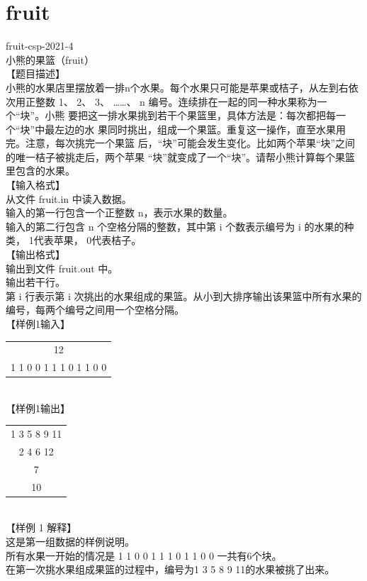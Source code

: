 \documentclass[12pt,twiside,a4paper]{ctexbook}
\numberwithin{chapter}{part}
\begin{document}
\section{fruit}
fruit-csp-2021-4\\
小熊的果篮（fruit）\\
【题目描述】\\
小熊的水果店里摆放着一排n个水果。每个水果只可能是苹果或桔子，从左到右依
次用正整数 1、 2、 3、 ……、 n 编号。连续排在一起的同一种水果称为一个“块”。小熊
要把这一排水果挑到若干个果篮里，具体方法是：每次都把每一个“块”中最左边的水
果同时挑出，组成一个果篮。重复这一操作，直至水果用完。注意，每次挑完一个果篮
后，“块”可能会发生变化。比如两个苹果“块”之间的唯一桔子被挑走后，两个苹果
“块”就变成了一个“块”。请帮小熊计算每个果篮里包含的水果。\\
【输入格式】\\
从文件 fruit.in 中读入数据。\\
输入的第一行包含一个正整数 n，表示水果的数量。\\
输入的第二行包含 n 个空格分隔的整数，其中第 i 个数表示编号为 i 的水果的种
类， 1代表苹果， 0代表桔子。\\
【输出格式】\\
输出到文件 fruit.out 中。\\
输出若干行。\\
第 i 行表示第 i 次挑出的水果组成的果篮。从小到大排序输出该果篮中所有水果的
编号，每两个编号之间用一个空格分隔。\\
【样例1输入】\\
\begin{tabular}{|c|}
\hline
12\\
1 1 0 0 1 1 1 0 1 1 0 0\\
\hline
\end{tabular}\\
【样例1输出】\\
\begin{tabular}{|c|}
\hline
1 3 5 8 9 11\\
2 4 6 12\\
7\\
10\\
\hline
\end{tabular}\\
【样例 1 解释】\\
这是第一组数据的样例说明。\\
所有水果一开始的情况是 1 1 0 0 1 1 1 0 1 1 0 0 一共有6个块。\\
在第一次挑水果组成果篮的过程中，编号为1 3 5 8 9 11的水果被挑了出来。\\
\end{document}

